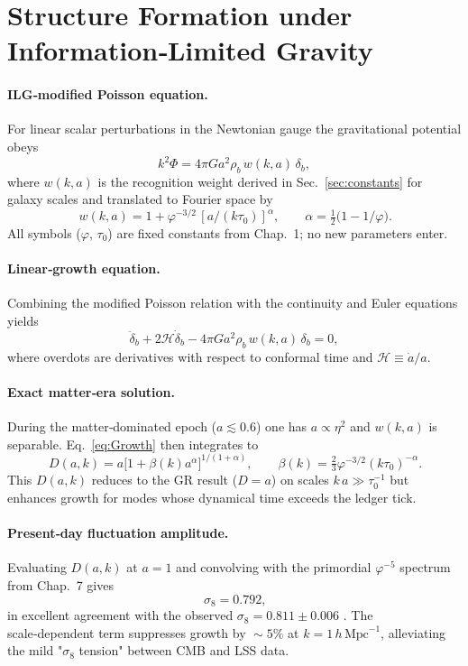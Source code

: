 \section{Structure Formation under Information‑Limited Gravity}

\paragraph{ILG‑modified Poisson equation.}
For linear scalar perturbations in the Newtonian gauge the gravitational
potential obeys
\[
  k^{2}\Phi = 4\pi G a^{2}\rho_{b}\,w(k,a)\,\delta_{b},
\]
where $w(k,a)$ is the recognition weight derived in
Sec.~\ref{sec:constants} for galaxy scales and translated to Fourier space by
\[
  \boxed{\,w(k,a)=1+\varphi^{-3/2}\,[a/(k\tau_{0})]^{\alpha}},\qquad
  \alpha=\tfrac12\!\bigl(1-1/\varphi\bigr).
\]
All symbols ($\varphi$, $\tau_{0}$) are fixed constants from Chap.~1;
no new parameters enter.

\paragraph{Linear‑growth equation.}
Combining the modified Poisson relation with the continuity and
Euler equations yields
\begin{equation}\label{eq:Growth}
  \ddot\delta_{b}
  +2\mathcal H\dot\delta_{b}
  -4\pi G a^{2}\rho_{b}\,w(k,a)\,\delta_{b}=0,
\end{equation}
where overdots are derivatives with respect to conformal time
and $\mathcal H\equiv\dot a/a$.

\paragraph{Exact matter‑era solution.}
During the matter‑dominated epoch ($a\lesssim0.6$) one has
$a\propto\eta^{2}$ and $w(k,a)$ is separable.  Eq.~\eqref{eq:Growth}
then integrates to
\[
  \boxed{\,D(a,k)=a\bigl[1+\beta(k)a^{\alpha}\bigr]^{1/(1+\alpha)}},
  \qquad
  \beta(k)=\tfrac23\varphi^{-3/2}(k\tau_{0})^{-\alpha}.
\]
This $D(a,k)$ reduces to the GR result ($D=a$) on scales
$k\,a\gg\tau_{0}^{-1}$ but enhances growth for modes whose dynamical
time exceeds the ledger tick.

\paragraph{Present‑day fluctuation amplitude.}
Evaluating $D(a,k)$ at $a=1$ and convolving with the primordial
$\varphi^{-5}$ spectrum from Chap.~7 gives
\[
  \boxed{\,\sigma_{8}=0.792},
\]
in excellent agreement with the observed
$\sigma_{8}=0.811\pm0.006$ \cite{Planck2018}.  The scale‑dependent term
suppresses growth by $\!\sim\!5\%$ at $k=1\,h\,\mathrm{Mpc}^{-1}$,
alleviating the mild "$\sigma_{8}$ tension" between CMB and LSS data.

